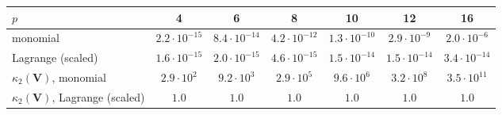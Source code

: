 \begin{tabular}{@{}lcccccc@{}}
\toprule
$p$ & 4 & 6 & 8 & 10 & 12 & 16\\
\midrule
monomial & $2.2\cdot10^{-15}$ & $8.4\cdot10^{-14}$ & $4.2\cdot10^{-12}$ & $1.3\cdot10^{-10}$ & $2.9\cdot10^{-9}$ & $2.0\cdot10^{-6}$\\
Lagrange (scaled) & $1.6\cdot10^{-15}$ & $2.0\cdot10^{-15}$ & $4.6\cdot10^{-15}$ & $1.5\cdot10^{-14}$ & $1.5\cdot10^{-14}$ & $3.4\cdot10^{-14}$\\
\midrule
$\kappa_2(\bm V)$, monomial & $2.9\cdot10^{2}$ & $9.2\cdot10^{3}$ & $2.9\cdot10^{5}$ & $9.6\cdot10^{6}$ & $3.2\cdot10^{8}$ & $3.5\cdot10^{11}$\\
$\kappa_2(\bm V)$, Lagrange (scaled) & $1.0$ & $1.0$ & $1.0$ & $1.0$ & $1.0$ & $1.0$\\
\bottomrule
\end{tabular}
